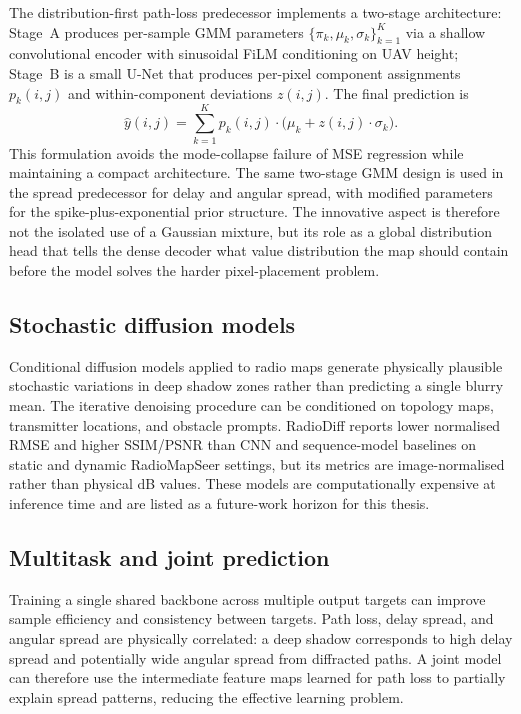 The distribution-first path-loss predecessor implements a two-stage architecture: Stage~A produces per-sample GMM
parameters $\{\pi_k, \mu_k, \sigma_k\}_{k=1}^{K}$ via a shallow convolutional
encoder with sinusoidal FiLM conditioning on UAV height; Stage~B is a small
U-Net that produces per-pixel component assignments $p_k(i,j)$ and
within-component deviations $z(i,j)$.  The final prediction is
\begin{equation}
  \hat{y}(i,j) = \sum_{k=1}^{K} p_k(i,j) \cdot \bigl(\mu_k + z(i,j) \cdot \sigma_k\bigr).
\end{equation}
This formulation avoids the mode-collapse failure of MSE regression while
maintaining a compact architecture.  The same two-stage GMM design is used in
the spread predecessor for delay and angular spread, with modified parameters for the
spike-plus-exponential prior structure.  The innovative aspect is therefore
not the isolated use of a Gaussian mixture, but its role as a global
distribution head that tells the dense decoder what value distribution the map
should contain before the model solves the harder pixel-placement problem.

\subsection{Stochastic diffusion models}

Conditional diffusion models applied to radio maps \cite{radiodiff2025} generate
physically plausible stochastic variations in deep shadow zones rather than
predicting a single blurry mean.  The iterative denoising procedure can be
conditioned on topology maps, transmitter locations, and obstacle prompts.
RadioDiff reports lower normalised RMSE and higher SSIM/PSNR than CNN and
sequence-model baselines on static and dynamic RadioMapSeer settings, but its
metrics are image-normalised rather than physical dB values.  These models are
computationally expensive at inference time and are listed as a future-work
horizon for this thesis.

\subsection{Multitask and joint prediction}

Training a single shared backbone across multiple output targets can improve
sample efficiency and consistency between targets.  Path loss, delay spread, and
angular spread are physically correlated: a deep shadow corresponds to high
delay spread and potentially wide angular spread from diffracted paths.  A joint
model can therefore use the intermediate feature maps learned for path loss to
partially explain spread patterns, reducing the effective learning problem.

